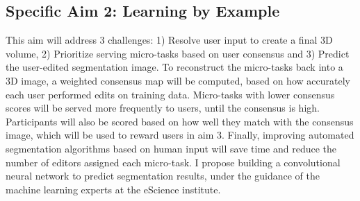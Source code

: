 
\subsection*{Specific Aim 2: Learning by Example}
This aim will address 3 challenges: 1) Resolve user input to create a final 3D volume, 2) Prioritize serving micro-tasks based on user consensus and 3) Predict the user-edited segmentation image. To reconstruct the micro-tasks back into a 3D image, a weighted consensus map will be computed, based on how accurately each user performed edits on training data. Micro-tasks with lower consensus scores will be served more frequently to users, until the consensus is high. Participants will also be scored based on how well they match with the consensus image, which will be used to reward users in aim 3. Finally, improving automated segmentation algorithms based on human input will save time and reduce the number of editors assigned each micro-task. I propose building a convolutional neural network to predict segmentation results, under the guidance of the machine learning experts at the eScience institute. 

